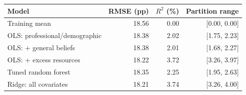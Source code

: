 \begin{tabular}{lrrr}
\toprule
Model & RMSE (pp) & $R^2$ (\%) & Partition range \\
\midrule
Training mean & 18.56 & 0.00 & [0.00, 0.00] \\
OLS: professional/demographic & 18.38 & 2.02 & [1.75, 2.23] \\
OLS: + general beliefs & 18.38 & 2.01 & [1.68, 2.27] \\
OLS: + excess resources & 18.22 & 3.72 & [3.26, 3.97] \\
Tuned random forest & 18.35 & 2.25 & [1.95, 2.63] \\
Ridge: all covariates & 18.21 & 3.74 & [3.26, 4.00] \\
\bottomrule
\end{tabular}
